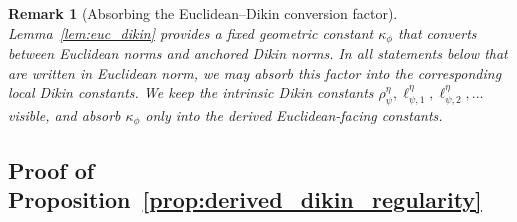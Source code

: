 \documentclass{article}
\newtheorem{remark}{Remark}
\begin{document}
\begin{remark}[Absorbing the Euclidean--Dikin conversion factor]
Lemma~\ref{lem:euc_dikin} provides a fixed geometric constant \(\kappa_\phi\) that converts
between Euclidean norms and anchored Dikin norms. In all statements below that are written in
Euclidean norm, we may absorb this factor into the corresponding local Dikin constants. We keep the intrinsic Dikin constants \(\rho_\psi^\eta,\ell_{\psi,1}^\eta,\ell_{\psi,2}^\eta,\ldots\)
visible, and absorb \(\kappa_\phi\) only into the derived Euclidean-facing constants.
\end{remark}



\subsection{Proof of Proposition~\ref{prop:derived_dikin_regularity}}
\label{app:proof_dikin_regularity}
\end{document}
